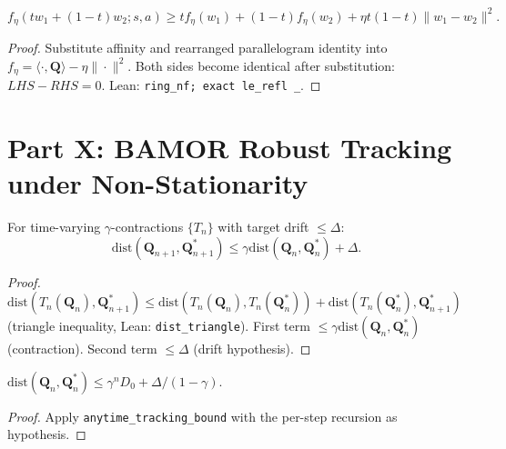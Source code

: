 \begin{theorem}
\begin{equation}
    f_\eta(tw_1 + (1{-}t)w_2; s,a) \ge tf_\eta(w_1) + (1{-}t)f_\eta(w_2) + \eta t(1{-}t)\|w_1 - w_2\|^2.
\end{equation}
\end{theorem}
\begin{proof}
Substitute affinity and rearranged parallelogram identity into $f_\eta = \langle \cdot, \mathbf{Q} \rangle - \eta\|\cdot\|^2$.  Both sides become identical after substitution: $LHS - RHS = 0$.  Lean: \texttt{ring\_nf; exact le\_refl \_}.
\end{proof}


\section{Part X: BAMOR Robust Tracking under Non-Stationarity}
\label{app:robust_tracking}

\begin{lemma}
For time-varying $\gamma$-contractions $\{T_n\}$ with target drift $\le \Delta$:
\begin{equation}
    \mathrm{dist}(\mathbf{Q}_{n+1}, \mathbf{Q}^*_{n+1}) \le \gamma \mathrm{dist}(\mathbf{Q}_n, \mathbf{Q}^*_n) + \Delta.
\end{equation}
\end{lemma}
\begin{proof}
$\mathrm{dist}(T_n(\mathbf{Q}_n), \mathbf{Q}^*_{n+1}) \le \mathrm{dist}(T_n(\mathbf{Q}_n), T_n(\mathbf{Q}^*_n)) + \mathrm{dist}(T_n(\mathbf{Q}^*_n), \mathbf{Q}^*_{n+1})$ (triangle inequality, Lean: \texttt{dist\_triangle}).  First term $\le \gamma \mathrm{dist}(\mathbf{Q}_n, \mathbf{Q}^*_n)$ (contraction).  Second term $\le \Delta$ (drift hypothesis).
\end{proof}

\begin{theorem}
$\mathrm{dist}(\mathbf{Q}_n, \mathbf{Q}^*_n) \le \gamma^n D_0 + \Delta/(1{-}\gamma)$.
\end{theorem}
\begin{proof}
Apply \texttt{anytime\_tracking\_bound} with the per-step recursion as hypothesis.
\end{proof}


